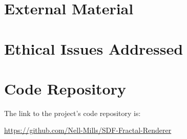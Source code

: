 \begin{appendices}

\chapter{External Material}

\chapter{Ethical Issues Addressed}

\chapter{Code Repository}\label{appendix:code-repository}

The link to the project's code repository is:\newline

\url{https://github.com/Nell-Mills/SDF-Fractal-Renderer}

\end{appendices}